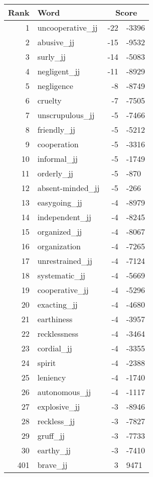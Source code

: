 \begin{longtable}[!htbp]{| rlr@{.}l |}
    \hline
    \textbf{Rank} & \textbf{Word} & \multicolumn{2}{c|}{\textbf{Score}} \\
    \hline
    \endhead
    1 & uncooperative\_jj & -22 & -3396 \\
    2 & abusive\_jj & -15 & -9532 \\
    3 & surly\_jj & -14 & -5083 \\
    4 & negligent\_jj & -11 & -8929 \\
    5 & negligence & -8 & -8749 \\
    6 & cruelty & -7 & -7505 \\
    7 & unscrupulous\_jj & -5 & -7466 \\
    8 & friendly\_jj & -5 & -5212 \\
    9 & cooperation & -5 & -3316 \\
    10 & informal\_jj & -5 & -1749 \\
    11 & orderly\_jj & -5 & -870 \\
    12 & absent-minded\_jj & -5 & -266 \\
    13 & easygoing\_jj & -4 & -8979 \\
    14 & independent\_jj & -4 & -8245 \\
    15 & organized\_jj & -4 & -8067 \\
    16 & organization & -4 & -7265 \\
    17 & unrestrained\_jj & -4 & -7124 \\
    18 & systematic\_jj & -4 & -5669 \\
    19 & cooperative\_jj & -4 & -5296 \\
    20 & exacting\_jj & -4 & -4680 \\
    21 & earthiness & -4 & -3957 \\
    22 & recklessness & -4 & -3464 \\
    23 & cordial\_jj & -4 & -3355 \\
    24 & spirit & -4 & -2388 \\
    25 & leniency & -4 & -1740 \\
    26 & autonomous\_jj & -4 & -1117 \\
    27 & explosive\_jj & -3 & -8946 \\
    28 & reckless\_jj & -3 & -7827 \\
    29 & gruff\_jj & -3 & -7733 \\
    30 & earthy\_jj & -3 & -7410 \\
    401 & brave\_jj & 3 & 9471 \\

\end{longtable}
